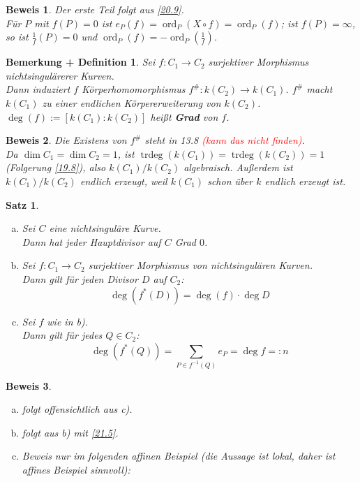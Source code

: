 \documentclass[a4paper,12pt]{report}
\theoremstyle{break}
\newtheorem{Satz}{Satz}
\newtheorem{BemDef}[Def]{Bemerkung + Definition}
\theoremstyle{nonumberbreak}
\newtheorem{Bew}{Beweis}
\theoremstyle{nonumberplain}
\newcommand{\emp}[1]{\textbf{\emph{#1}}}
\newcommand{\begriff}[1]{{\index{#1}}\emp{#1}}
\DeclareMathOperator{\trdeg}{trdeg}
\DeclareMathOperator{\ord}{ord}
\begin{document}
\begin{Bew}
Der erste Teil folgt aus \ref{20.9}.\\
F\"ur $P$ mit $f(P)=0$ ist $e_P(f) = \ord_P(X \circ f) = \ord_P(f)$; ist $f(P)=\infty$, so ist $\frac{1}{f}(P)=0$ und $\ord_P(f) = -\ord_P(\frac{1}{f})$.
\end{Bew}

\begin{BemDef}
Sei $f:C_1\to C_2$ surjektiver Morphismus nichtsingul\"arerer Kurven.\\
Dann induziert $f$ K\"orperhomomorphismus $f^\#: k(C_2) \to k(C_1)$. $f^\#$ macht $k(C_1)$ zu einer endlichen K\"orpererweiterung von $k(C_2)$.\\
$\deg(f) := [k(C_1) : k(C_2)]$ hei\ss t \begriff{Grad} von $f$.
\end{BemDef}

\begin{Bew}
Die Existens von $f^\#$ steht in 13.8 \textcolor{red}{(kann das nicht finden)}.\\
Da $\dim C_1 = \dim C_2 = 1$, ist $\trdeg(k(C_1)) = \trdeg(k(C_2)) = 1$ (Folgerung \ref{19.8}), also $k(C_1)/k(C_2)$ algebraisch. Au\ss erdem ist $k(C_1)/k(C_2)$ endlich erzeugt, weil $k(C_1)$ schon \"uber $k$ endlich erzeugt ist.
\end{Bew}

\begin{Satz}\begin{enumerate}[a)]
\item
	Sei $C$ eine nichtsingul\"are Kurve.\\
	Dann hat jeder Hauptdivisor auf $C$ Grad $0$.
\item
	Sei $f: C_1 \to C_2$ surjektiver Morphismus von nichtsingul\"aren Kurven.\\
	Dann gilt f\"ur jeden Divisor $D$ auf $C_2$:
		\[ \deg(f^*(D)) = \deg(f) \cdot \deg D \]
\item
	Sei $f$ wie in b).\\
	Dann gilt f\"ur jedes $Q\in C_2$:
		\[ \deg(f^*(Q)) = \sum_{P\in f^{-1}(Q)} e_P = \deg f =: n \]
\end{enumerate}\end{Satz}

\begin{Bew}\begin{enumerate}[a)]
\item[b)]
	folgt offensichtlich aus c).
\item[a)]
	folgt aus b) mit \ref{21.5}.
\item[c)]
	Beweis nur im folgenden affinen Beispiel (die Aussage ist lokal, daher ist affines Beispiel sinnvoll):
\end{enumerate}\end{Bew}
\end{document}
